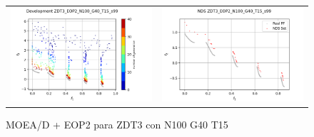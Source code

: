 \begin{figure}[H]
\begin{tabular}{c c}
    \includegraphics[scale=0.5]{figures/ZDT3_EOP2_N100_G40_T15/s99_dev.png} &
    \includegraphics[scale=0.5]{figures/ZDT3_EOP2_N100_G40_T15/s99_nds.png}\\
    \end{tabular}
    \caption{MOEA/D + EOP2 para ZDT3 con N100 G40 T15 }
    \label{fig:10}
\end{figure}

